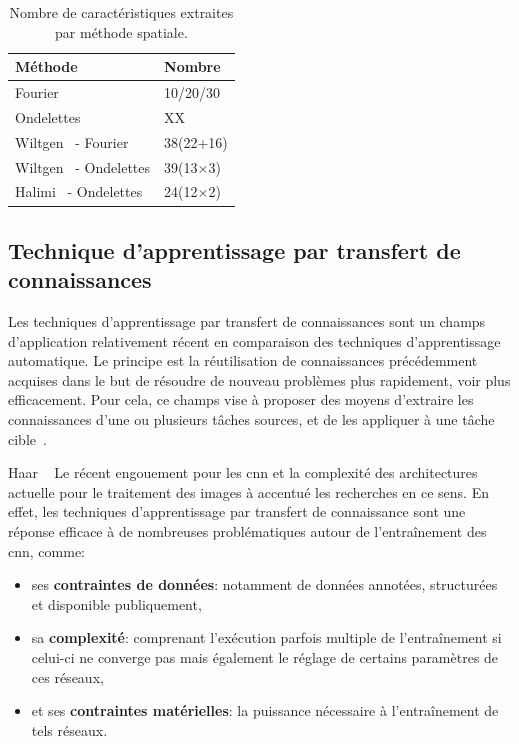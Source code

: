 \begin{table}[h]
    \centering
    \begin{tabular*}{0.6\linewidth}{l@{\extracolsep{\fill}}l}
        \toprule
        \textbf{Méthode}                        & \textbf{Nombre}   \\ \hline
        Fourier                                 & 10/20/30          \\ \hline
        Ondelettes                              & XX                \\ \hline
        Wiltgen~\cite{Wiltgen2008} - Fourier    & 38(22+16)         \\ \hline
        Wiltgen~\cite{Wiltgen2008} - Ondelettes & 39(13$\times$3)   \\ \hline
        Halimi~\cite{Halimi2017a} - Ondelettes  & 24(12$\times$2)   \\
        \bottomrule
    \end{tabular*}
    \caption{Nombre de caractéristiques extraites par méthode spatiale.}
    \label{tab:number_features_frequency}
\end{table}\par

\subsection{Technique d'apprentissage par transfert de connaissances}
Les techniques d'apprentissage par transfert de connaissances sont un champs d'application relativement récent en comparaison des techniques d'apprentissage automatique. Le principe est la réutilisation de connaissances précédemment acquises dans le but de résoudre de nouveau problèmes plus rapidement, voir plus efficacement. Pour cela, ce champs vise à  proposer des moyens d'extraire les connaissances d'une ou plusieurs tâches sources, et de les appliquer à une tâche cible~\cite{QiangYang2010}.\par
Haar ~\cite{Ghazali2007}
Le récent engouement pour les \gls{cnn} et la complexité des architectures actuelle pour le traitement des images à accentué les recherches en ce sens. En effet, les techniques d'apprentissage par transfert de connaissance sont une réponse efficace à de nombreuses problématiques autour de l'entraînement des \gls{cnn}, comme: 
\begin{itemize}
    \item ses \textbf{contraintes de données}: notamment de données annotées, structurées et disponible publiquement,
    \item sa \textbf{complexité}: comprenant l'exécution parfois multiple de l'entraînement si celui-ci ne converge pas mais également le réglage de certains paramètres de ces réseaux,
    \item et ses \textbf{contraintes matérielles}: la puissance nécessaire à l'entraînement de tels réseaux.
\end{itemize}\par

